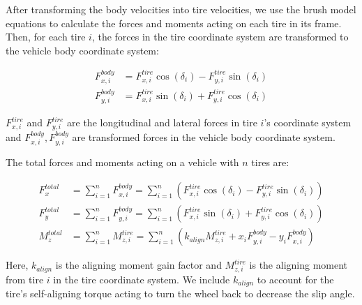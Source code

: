 \documentclass[letterpaper, 10 pt, conference]{ieeeconf}  %
\begin{document}
After transforming the body velocities into tire velocities, we use the brush model equations to calculate the forces and moments acting on each tire in its frame. Then, for each tire $i$, the forces in the tire coordinate system are transformed to the vehicle body coordinate system:

\begin{align}
    F_{x,i}^{body} &= F_{x,i}^{tire} \cos(\delta_i) - F_{y,i}^{tire} \sin(\delta_i) \\
    F_{y,i}^{body} &= F_{x,i}^{tire} \sin(\delta_i) + F_{y,i}^{tire} \cos(\delta_i)
\end{align}

$F_{x,i}^{tire}$ and $ F_{y,i}^{tire}$ are the longitudinal and lateral forces in tire $i$'s coordinate system and $F_{x,i}^{body}, F_{y,i}^{body}$ are transformed forces in the vehicle body coordinate system.

The total forces and moments acting on a vehicle with $n$ tires are:

\begin{align}
    F_x^{total} &= \sum_{i=1}^{n} F_{x,i}^{body} = \sum_{i=1}^{n} \left( F_{x,i}^{tire} \cos(\delta_i) - F_{y,i}^{tire} \sin(\delta_i) \right) \\
    F_y^{total} &= \sum_{i=1}^{n} F_{y,i}^{body} = \sum_{i=1}^{n} \left( F_{x,i}^{tire} \sin(\delta_i) + F_{y,i}^{tire} \cos(\delta_i) \right) \\
    M_z^{total} &= \sum_{i=1}^{n} M_{z,i}^{tire} = \sum_{i=1}^{n}(k_{align}M_{z,i}^{tire} + x_i F_{y,i}^{body} - y_i F_{x,i}^{body})
\end{align}

Here, $k_{align}$ is the aligning moment gain factor and $M_{z,i}^{tire}$ is the aligning moment from tire $i$ in the tire coordinate system. We include $k_{align}$ to account for the tire's self-aligning torque acting to turn the wheel back to decrease the slip angle.
\end{document}

